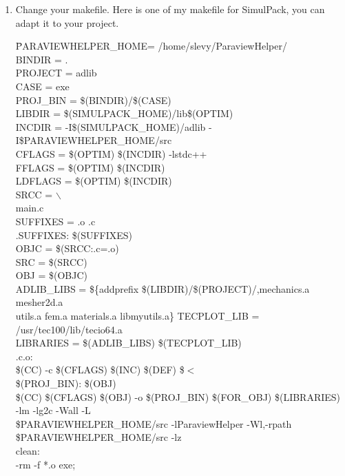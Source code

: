 \begin{enumerate}
	\item Change your makefile. Here is one of my makefile for SimulPack, you can adapt it to your project.

	\begin{tabbing}
	\hspace{15mm} \= PARAVIEWHELPER\_HOME= /home/slevy/ParaviewHelper/\\
	\>BINDIR = . \\
	\>PROJECT = adlib\\
	\>CASE   = exe\\
	\>PROJ\_BIN = \$(BINDIR)/\$(CASE)\\
	\>LIBDIR  = \$(SIMULPACK\_HOME)/lib\$(OPTIM)\\
	\>INCDIR =   -I\$(SIMULPACK\_HOME)/adlib -I\${PARAVIEWHELPER\_HOME}/src\\
	\>CFLAGS =  \$(OPTIM) \$(INCDIR) -lstdc++\\
	\>FFLAGS =  \$(OPTIM) \$(INCDIR)\\
	\>LDFLAGS = \$(OPTIM) \$(INCDIR)\\
	\>SRCC = $\backslash$\\
	\> 	 \hspace{1cm}main.c\\
	\>SUFFIXES = .o .c\\
	\>.SUFFIXES: \$(SUFFIXES)\\
	\>OBJC    = \$(SRCC:.c=.o)\\
	\>SRC = \$(SRCC)\\
	\>OBJ = \$(OBJC)\\
	\>ADLIB\_LIBS = \$\{addprefix \$(LIBDIR)/\$(PROJECT)/,mechanics.a mesher2d.a \\
	\> \hspace{1cm} utils.a fem.a materials.a libmyutils.a\} TECPLOT\_LIB = /usr/tec100/lib/tecio64.a\\
	\>LIBRARIES = \$(ADLIB\_LIBS) \$(TECPLOT\_LIB)\\
	\>.c.o:\\
	\>	\hspace{1cm}\$(CC) -c  \$(CFLAGS) \$(INC) \$(DEF) \$$<$\\
	\>\$(PROJ\_BIN): \$(OBJ)\\
	\>       \hspace{1cm} \$(CC) \$(CFLAGS) \$(OBJ) -o \$(PROJ\_BIN) \$(FOR\_OBJ) \$(LIBRARIES) -lm -lg2c -Wall -L\\
        \>\${PARAVIEWHELPER\_HOME}/src -lParaviewHelper -Wl,-rpath \${PARAVIEWHELPER\_HOME}/src -lz\\
	\>clean:\\
	\>        \hspace{1cm} -rm -f *.o exe;\\
	\end{tabbing}

	\end{enumerate}


